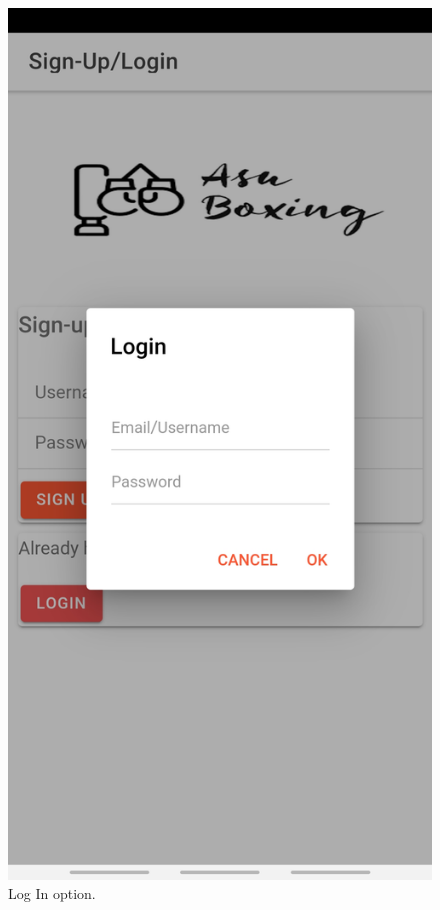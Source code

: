 \documentclass[a4paper,12pt]{report}
\begin{document}
\begin{figure}[ht]
\begin{minipage}[b]{0.5\linewidth}
    \includegraphics[width=.7\linewidth]{images/aplicationImages/logIn.jpeg} 
    \caption{Log In option.} 
    \vspace{4ex}
  \end{minipage} 
\end{figure}
\end{document}
